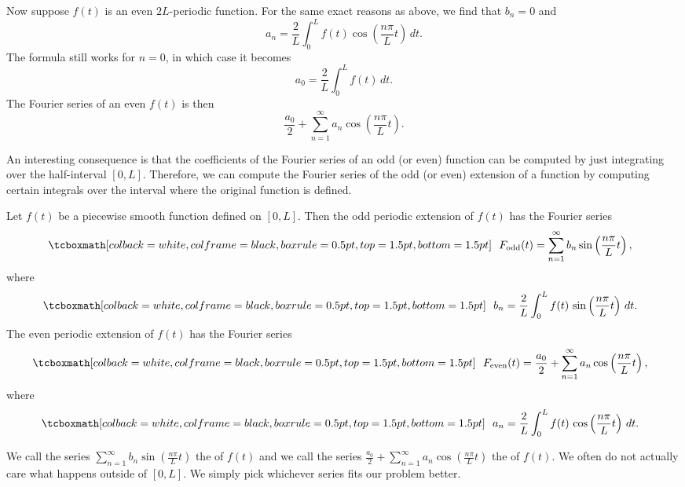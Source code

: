 Now suppose $f(t)$ is an even $2L$-periodic function.
For the same exact
reasons as above, we find that $b_n = 0$ and
\begin{equation*}
a_n = 
\frac{2}{L} \int_{0}^L f(t) \cos \left( \frac{n \pi}{L} t \right) \, dt .
\end{equation*}
The formula still works for $n=0$, in which case it becomes
\begin{equation*}
a_0 = 
\frac{2}{L} \int_{0}^L f(t) \, dt .
\end{equation*}
The Fourier series of an even $f(t)$ is then
\begin{equation*}
\frac{a_0}{2}
+
\sum_{n=1}^\infty a_n \cos \left( \frac{n \pi}{L} t \right) .
\end{equation*}

An interesting consequence is that the coefficients of the Fourier series of
an odd (or even) function can be computed by just integrating over the
half-interval $[0,L]$.  Therefore, we can compute the Fourier series of
the odd (or even) extension of a
function by computing certain integrals over the interval
where the original function is defined.

\begin{theorem}
Let $f(t)$ be a piecewise smooth function defined on $[0,L]$.
Then the odd periodic extension
of $f(t)$ has the Fourier series
\begin{equation*}
\mybxbg{~~
F_{\text{odd}}(t) = \sum_{n=1}^\infty b_n \sin \left( \frac{n \pi}{L} t
\right) ,
~~}
\end{equation*}
where
\begin{equation*}
\mybxbg{~~
b_n = 
\frac{2}{L} \int_{0}^L f(t)\, \sin \left( \frac{n \pi}{L} t \right) \, dt .
~~}
\end{equation*}
The even periodic extension of $f(t)$ has the Fourier series
\begin{equation*}
\mybxbg{~~
F_{\text{even}}(t) = \frac{a_0}{2} + \sum_{n=1}^\infty a_n \cos \left(
\frac{n \pi}{L} t \right) ,
~~}
\end{equation*}
where
\begin{equation*}
\mybxbg{~~
a_n = 
\frac{2}{L} \int_{0}^L f(t)\, \cos \left( \frac{n \pi}{L} t \right) \, dt .
~~}
\end{equation*}
\end{theorem}

We call the series $\sum_{n=1}^\infty b_n \sin \left( \frac{n \pi}{L} t\right)$ 
the \emph{} of $f(t)$ and we call the series
$\frac{a_0}{2} + \sum_{n=1}^\infty a_n \cos \left( \frac{n \pi}{L} t
\right)$
the \emph{} of $f(t)$.  
We often do not actually care what happens outside of $[0,L]$.
We simply pick whichever series fits our problem better.

